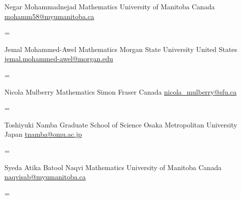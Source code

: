 \documentclass[
  letterpaper,
  DIV=11,
  numbers=noendperiod]{scrartcl}
\newenvironment{absolutelynopagebreak}
  {\par\nobreak\vfil\penalty0\vfilneg
   \vtop\bgroup}
  {\par\xdef\tpd{\the\prevdepth}\egroup
   \prevdepth=\tpd}
\begin{document}
\begin{absolutelynopagebreak}Negar   Mohammadnejad \newline
\mbox{}\quad  Mathematics \newline
\mbox{}\quad  University of Manitoba \newline
\mbox{}\quad  Canada \newline
\mbox{}\quad \href{mailto: mohamm58@myumanitoba.ca }{ mohamm58@myumanitoba.ca }
\end{absolutelynopagebreak}\vskip0.2cm
\begin{absolutelynopagebreak}Jemal   Mohammed-Awel \newline
\mbox{}\quad  Mathematics \newline
\mbox{}\quad  Morgan State University \newline
\mbox{}\quad  United States \newline
\mbox{}\quad \href{mailto: jemal.mohammed-awel@morgan.edu }{ jemal.mohammed-awel@morgan.edu }
\end{absolutelynopagebreak}\vskip0.2cm
\begin{absolutelynopagebreak}Nicola   Mulberry \newline
\mbox{}\quad  Mathematics \newline
\mbox{}\quad  Simon Fraser \newline
\mbox{}\quad  Canada \newline
\mbox{}\quad \href{mailto: nicola\_mulberry@sfu.ca }{ nicola\_mulberry@sfu.ca }
\end{absolutelynopagebreak}\vskip0.2cm
\begin{absolutelynopagebreak}Toshiyuki   Namba \newline
\mbox{}\quad  Graduate School of Science \newline
\mbox{}\quad  Osaka Metropolitan University \newline
\mbox{}\quad  Japan \newline
\mbox{}\quad \href{mailto: tnamba@omu.ac.jp }{ tnamba@omu.ac.jp }
\end{absolutelynopagebreak}\vskip0.2cm
\begin{absolutelynopagebreak}Syeda Atika Batool   Naqvi \newline
\mbox{}\quad  Mathematics \newline
\mbox{}\quad  University of Manitoba \newline
\mbox{}\quad  Canada \newline
\mbox{}\quad \href{mailto: naqvisab@myumanitoba.ca }{ naqvisab@myumanitoba.ca }
\end{absolutelynopagebreak}\vskip0.2cm
\end{document}
